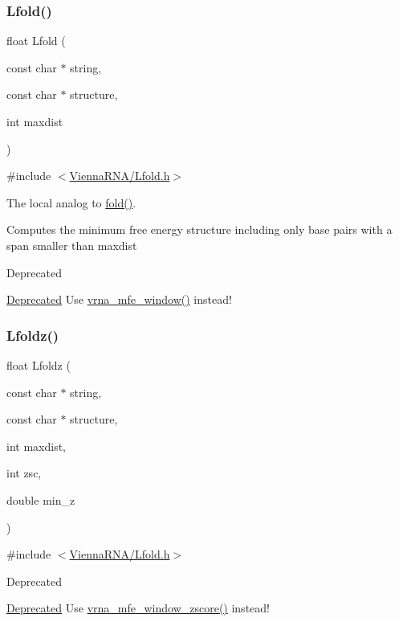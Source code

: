 \subsubsection{\texorpdfstring{Lfold()}{Lfold()}}
{\footnotesize\ttfamily float Lfold (\begin{DoxyParamCaption}\item[{const char $\ast$}]{string,  }\item[{const char $\ast$}]{structure,  }\item[{int}]{maxdist }\end{DoxyParamCaption})}



{\ttfamily \#include $<$\mbox{\hyperlink{Lfold_8h}{Vienna\+R\+N\+A/\+Lfold.\+h}}$>$}



The local analog to \mbox{\hyperlink{group__mfe__global__deprecated_gaadafcb0f140795ae62e5ca027e335a9b}{fold()}}. 

Computes the minimum free energy structure including only base pairs with a span smaller than \textquotesingle{}maxdist\textquotesingle{}

\begin{DoxyRefDesc}{Deprecated}
\item[\mbox{\hyperlink{deprecated__deprecated000086}{Deprecated}}]Use \mbox{\hyperlink{group__mfe__window_ga689df235a1915a1ad56e377383c044ce}{vrna\+\_\+mfe\+\_\+window()}} instead! \end{DoxyRefDesc}
\mbox{\label{group__mfe__window__deprecated_ga9b568887c6091a54252729adcb35f6d2}} 
\subsubsection{\texorpdfstring{Lfoldz()}{Lfoldz()}}
{\footnotesize\ttfamily float Lfoldz (\begin{DoxyParamCaption}\item[{const char $\ast$}]{string,  }\item[{const char $\ast$}]{structure,  }\item[{int}]{maxdist,  }\item[{int}]{zsc,  }\item[{double}]{min\+\_\+z }\end{DoxyParamCaption})}



{\ttfamily \#include $<$\mbox{\hyperlink{Lfold_8h}{Vienna\+R\+N\+A/\+Lfold.\+h}}$>$}

\begin{DoxyRefDesc}{Deprecated}
\item[\mbox{\hyperlink{deprecated__deprecated000087}{Deprecated}}]Use \mbox{\hyperlink{group__mfe__window_gaa4f67ae94efd08d800c17f9b53423fd6}{vrna\+\_\+mfe\+\_\+window\+\_\+zscore()}} instead! \end{DoxyRefDesc}
